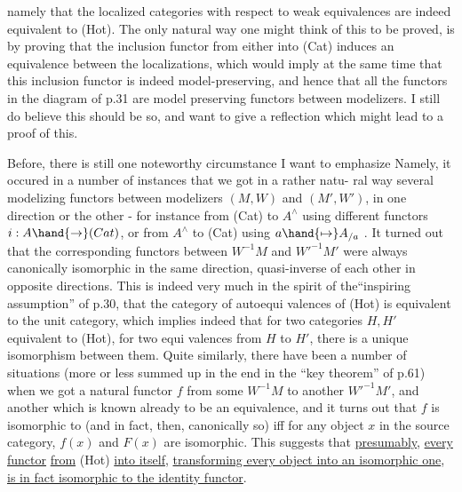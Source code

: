 
namely that the localized categories with respect to weak equivalences are
indeed equivalent to (Hot). The only natural way one might think of this
to be proved, is by proving that the inclusion functor from either into
(Cat) induces an equivalence between the localizations, which would imply
at the same time that this inclusion functor is indeed model-preserving,
and hence that all the functors in the diagram of p.31 are model preserving
functors between modelizers. I still do believe this should be so, and
want to give  a reflection which might lead to a proof of this.

Before, there is still one noteworthy circumstance I want to emphasize
Namely, it occured in a number of instances that we got in a rather natu-%
ral way several modelizing functors between  modelizers $(M,W)$ and $(M',W')$,
in one direction or the other - for instance from (Cat) to $A^{\wedge}$ using
different functors $i: A \hand{\to} (Cat)$, or from $A^{\wedge}$ to (Cat) using $a \hand{\mapsto} A_{/a}$ .
It turned out that the corresponding functors between $W^{-1}M$ and $W'^{-1}M'$ were
always canonically isomorphic   in the same direction,  quasi-inverse
of each other   in opposite directions. This is indeed very much in the
spirit of the``inspiring assumption'' of p.30, that the category of autoequi
valences of (Hot) is equivalent to the unit category, which implies indeed
that for two categories $H,H'$ equivalent to (Hot),  for two equi
valences from $H$ to $H'$, there is a unique isomorphism between them. Quite
similarly, there have been a number of situations (more or less summed up
in the end in the ``key theorem'' of p.61) when  we got a natural functor $f$
from some $W^{-1}M$ to another $W'^{-1}M'$, and another  which is known already to be
an equivalence, and it turns out that $f$ is isomorphic to  (and in fact,
then, canonically so) iff for any object $x$ in the source category, $f(x)$
and $F(x)$ are isomorphic. This suggests that \uline{presumably}, \uline{every functor}
\uline{from} (Hot) \uline{into itself}, \uline{transforming every object into an isomorphic one},
\uline{is in fact isomorphic to the identity functor}.

